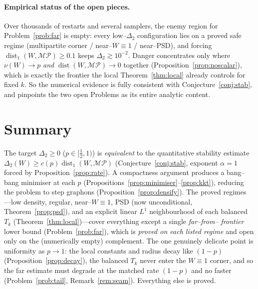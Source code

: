 \documentclass[11pt]{article}
\theoremstyle{definition}
\newcommand{\dist}{\operatorname{dist}}
\newcommand{\MP}{\mathcal{MP}}
\newcommand{\Tk}{T_k}
\begin{document}
\paragraph{Empirical status of the open pieces.}  Over thousands of restarts and
several samplers, the enemy region for Problem~\ref{prob:far} is empty: every
low--$\Delta_2$ configuration lies on a proved safe regime (multipartite corner /
near--$W\equiv1$ / near--PSD), and forcing $\dist_1(W,\MP)\ge0.1$ keeps
$\Delta_2\gtrsim10^{-2}$.  Danger concentrates only where $\nu(W)\to p$
\emph{and} $\dist(W,\MP)\to0$ together (Proposition~\ref{prop:noscalar}), which is
exactly the frontier the local Theorem~\ref{thm:local} already controls for fixed
$k$.  So the numerical evidence is fully consistent with
Conjecture~\ref{conj:stab}, and pinpoints the two open Problems as its entire
analytic content.

\section*{Summary}
The target $\Delta_2\ge0$ ($p\in[\tfrac12,1)$) is \emph{equivalent} to the
quantitative stability estimate $\Delta_2(W)\ge c(p)\dist_1(W,\MP)$
(Conjecture~\ref{conj:stab}, exponent $\alpha=1$ forced by
Proposition~\ref{prop:rate}).  A compactness argument produces a bang--bang
minimiser at each $p$ (Propositions~\ref{prop:minimiser}--\ref{prop:kkt}), reducing
the problem to step graphons (Proposition~\ref{prop:densify}).  The proved regimes
---low density, regular, near--$W\equiv1$, PSD (now unconditional,
Theorem~\ref{prop:psd}), and
an explicit linear $L^1$ neighbourhood of each balanced $\Tk$
(Theorem~\ref{thm:local})---cover everything except a single \emph{far--from--%
frontier} lower bound (Problem~\ref{prob:far}), which is \emph{proved on each
listed regime} and open only on the (numerically empty) complement.  The one
genuinely delicate point is uniformity as $p\to1$: the local constants and radius
decay like $(1-p)$ (Proposition~\ref{prop:decay}), the balanced $\Tk$ never enter
the $W\equiv1$ corner, and so the far estimate must degrade at the matched rate
$(1-p)$ and no faster (Problem~\ref{prob:tail}, Remark~\ref{rem:seam}).  Everything
else is proved.
\end{document}
